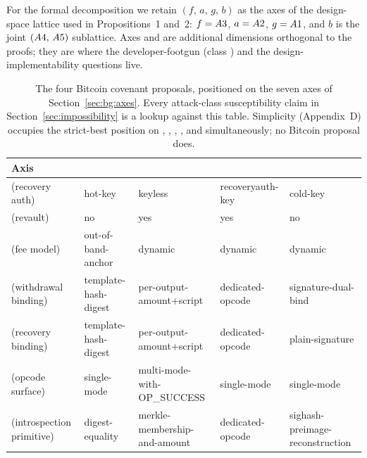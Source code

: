 For the formal decomposition we retain $(f,\,a,\,g,\,b)$ as the axes
of the design-space lattice used in Propositions~1 and~2: $f =
A3$, $a = A2$, $g = A1$, and $b$ is the joint
$(A4,\,A5)$ sublattice. Axes \axopsurf{} and \axintro{}
are additional dimensions orthogonal to the proofs; they are where the
developer-footgun (class \classmode{}) and the design-implementability
questions live.

\begin{table}[t]
\centering
\caption{The four Bitcoin covenant proposals, positioned on
the seven axes of Section~\ref{sec:bg:axes}. Every attack-class
susceptibility claim in Section~\ref{sec:impossibility} is a lookup
against this table. Simplicity (Appendix~D) occupies the strict-best
position on \axauth{}, \axrevault{}, \axwdbind{}, \axrecbind{}, and
\axintro{} simultaneously; no Bitcoin proposal does.}
\label{tab:design_space}
\footnotesize
\setlength{\tabcolsep}{2.2pt}
\renewcommand{\arraystretch}{1.12}
\begin{tabular}{@{}lllll@{}}
\toprule
Axis                                    & \opctv{}                       & \opccv{}                               & \opvault{}                    & \catcsfs{}                      \\
\midrule
\axauth{}  (recovery auth)              & hot-key                        & keyless                                & recoveryauth-key              & cold-key                        \\
\axrevault{} (revault)                  & no                             & yes                                    & yes                           & no                              \\
\axfee{}   (fee model)                  & out-of-band-anchor             & dynamic                                & dynamic                       & dynamic                         \\
\axwdbind{} (withdrawal binding)        & template-hash-digest           & per-output-amount+script               & dedicated-opcode              & signature-dual-bind             \\
\axrecbind{} (recovery binding)         & template-hash-digest           & per-output-amount+script               & dedicated-opcode              & plain-signature                 \\
\axopsurf{}  (opcode surface)           & single-mode                    & multi-mode-with-OP\_SUCCESS            & single-mode                   & single-mode                     \\
\axintro{}   (introspection primitive)  & digest-equality                & merkle-membership-and-amount           & dedicated-opcode              & sighash-preimage-reconstruction \\
\bottomrule
\end{tabular}
\renewcommand{\arraystretch}{1.0}
\end{table}

